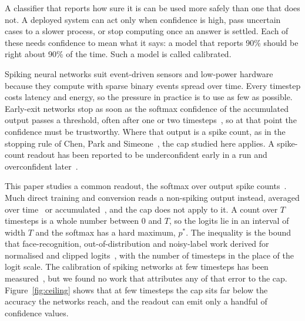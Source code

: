 \documentclass[10pt]{article}
\begin{document}
A classifier that reports how sure it is can be used more safely than one that does not. A
deployed system can act only when confidence is high, pass uncertain cases to a slower process,
or stop computing once an answer is settled. Each of these needs confidence to mean what it
says: a model that reports 90\% should be right about 90\% of the time. Such a model is called %
calibrated.

Spiking neural networks suit event-driven sensors and low-power hardware because they compute
with sparse binary events spread over time. Every timestep costs latency and energy, so the
pressure in practice is to use as few as possible. Early-exit networks stop as soon as the softmax
confidence of the accumulated output passes a threshold, often after one or two
timesteps~\citep{li2023seenn}, so at that point the confidence must be trustworthy. Where that
output is a spike count, as in the stopping rule of Chen, Park and Simeone~\citep{chen2025knowing},
the cap studied here applies. A spike-count %
readout has been reported to be underconfident early in a run and overconfident
later~\citep{chen2025knowing}. %

This paper studies a common readout, the softmax over output spike
counts~\citep{wu2019spikecount,shrestha2022spikemax,chen2025knowing}. Much direct training and %
conversion reads a non-spiking output instead, averaged over time~\citep{yan2025temporal} or %
accumulated~\citep{li2023dynamic}, and the cap does not apply to it. %
A count over $T$ timesteps is a whole number between $0$ and $T$,
so the logits lie in an interval of width $T$ and the softmax has a hard maximum, $p^{*}$. The
inequality is the bound that face-recognition, out-of-distribution and noisy-label
work derived for normalised and clipped
logits~\citep{wang2017normface,zhang2019adacos,wei2022logitnorm,wei2023logitclip}, with the number %
of timesteps in the place of the logit scale. The calibration of spiking networks at few timesteps has been
measured~\citep{sun2023mcdropout,yan2025temporal,katti2024bayesian}, but we found no work that attributes any of %
that error to the cap. Figure~\ref{fig:ceiling} shows that at few timesteps the
cap sits far below the accuracy the networks reach, and the readout can emit only a handful of
confidence values.
\end{document}
